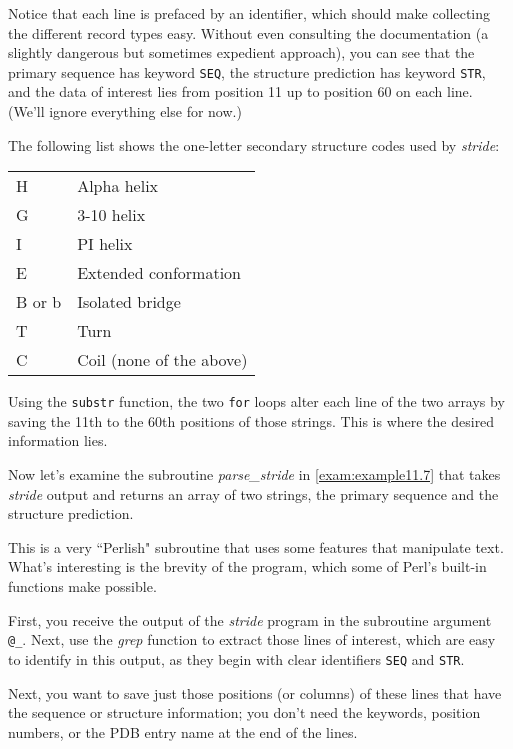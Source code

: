 Notice that each line is prefaced by an identifier, which should make collecting the different record types easy. Without even consulting the documentation (a slightly dangerous but sometimes expedient approach), you can see that the primary sequence has keyword \verb|SEQ|, the structure prediction has keyword \verb|STR|, and the data of interest lies from position 11 up to position 60 on each line. (We'll ignore everything else for now.)

The following list shows the one-letter secondary structure codes used by \textit{stride}: 

\begin{table}[!htbp]
  \begin{center}
  \begin{tabu} to 0.5\linewidth {X[1,l]X[2,l]}
  \toprule
  H & Alpha helix\\
  G & 3-10 helix\\
  I & PI helix\\
  E & Extended conformation\\
  B or b& Isolated bridge\\
  T & Turn\\
  C & Coil (none of the above)\\
  \bottomrule
  \end{tabu}
  \end{center}
\end{table}

Using the \verb|substr| function, the two \verb|for| loops alter each line of the two arrays by saving the 11th to the 60th positions of those strings. This is where the desired information lies.

Now let's examine the subroutine \textit{parse\_stride} in \autoref{exam:example11.7} that takes \textit{stride} output and returns an array of two strings, the primary sequence and the structure prediction.

This is a very ``Perlish" subroutine that uses some features that manipulate text. What's interesting is the brevity of the program, which some of Perl's built-in functions make possible.

First, you receive the output of the \textit{stride} program in the subroutine argument \verb|@_|. Next, use the \textit{grep} function to extract those lines of interest, which are easy to identify in this output, as they begin with clear identifiers \verb|SEQ| and \verb|STR|.  

Next, you want to save just those positions (or columns) of these lines that have the sequence or structure information; you don't need the keywords, position numbers, or the PDB entry name at the end of the lines.


